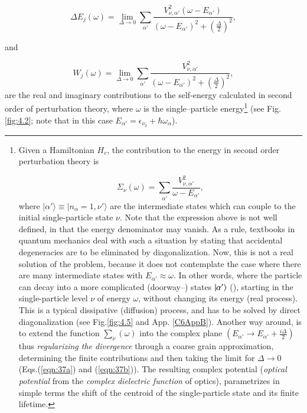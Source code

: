 \begin{equation}\label{eqn:37a}
\Delta E_j(\omega)  = \lim_{\Delta \rightarrow 0} \sum_{\alpha'} \frac{V^2_{\nu ,\alpha'} (\omega-E_{\alpha'})}{(\omega -E_{\alpha'})^2 + (\frac{\Delta}{2})^2},
\end{equation}

\noindent and

\begin{equation}
W_j(\omega)  = \lim_{\Delta \rightarrow 0} \sum_{\alpha'} \frac{V_{\nu ,\alpha'}^2}{(\omega -E_{\alpha'})^2 + (\frac{\Delta}{2})^2},
\label{eqn:37b}
\end{equation}
are the real and imaginary contributions to the self-energy calculated in second order of perturbation theory, where $\omega$ is the single--particle energy\footnote{Given a Hamiltonian $H_{c}$, the contribution to the energy in second order perturbation theory is

{\protect
\begin{equation}
\nonumber\Sigma_{\nu}(\omega) = \sum_{\alpha'} \frac{V_{\nu ,\alpha'}^2}{\omega - E_{\alpha'}} ,
\label{eqn:37c}
\end{equation}
}
where $|\alpha' \rangle \equiv |n_{\alpha}=1,\nu' \rangle$ are the intermediate states which can couple to the initial single-particle state $\nu$. Note that the expression above is not well defined, in that the energy denominator may vanish. As a rule, textbooks in quantum mechanics deal with such a situation by stating that accidental degeneracies are to be eliminated by diagonalization. Now, this is not a real solution of the problem, because it does not contemplate the case where there are many intermediate states with $E_{\alpha'} \approx \omega$. In other words, where the particle can decay into a more complicated (doorway--) states $|{\alpha'} \rangle$  (\cite{Feshbach:58}), starting in the single-particle level $\nu$ of energy $\omega$, without changing its energy (real process). This is a typical dissipative (diffusion) process, and has to be solved by direct diagonalization (see Fig.\ref{fig:4.5} and App. \ref{C6AppB}). Another way around, is to extend the function $\sum_{\nu}(\omega)$ into the complex plane $(E_{\alpha'} \rightarrow E_{\alpha'} + \frac{i\Delta}{2})$ thus {\it regularizing the divergence} through a coarse grain approximation, determining the finite contributions and then taking the limit for $\Delta \rightarrow 0$ (Eqs.(\ref{eqn:37a}) and (\ref{eqn:37b})). The resulting complex potential ({\it optical potential} from the {\it complex dielectric function} of optics), parametrizes in simple terms the shift of the centroid of the single-particle state and its finite lifetime.} (see Fig. \ref{fig:4.2}; note that in this case $E_{\alpha'}=\epsilon_{\nu_2}+\hbar\omega_\alpha$).

